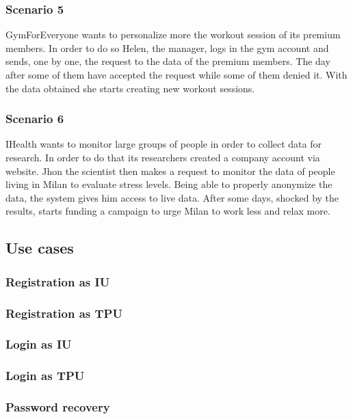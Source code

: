 \subsubsection{Scenario 5}
GymForEveryone wants to personalize more the workout session of its premium members. In order to do so Helen, the manager, logs in the gym account and sends, one by one, the request to the data of the premium members. The day after some of them have accepted the request while some of them denied it. With the data obtained she starts creating new workout sessions.
\subsubsection{Scenario 6}
IHealth wants to monitor large groups of people in order to collect data for research. In order to do that its researchers created a company account via website. Jhon the scientist then makes a request to monitor the data of people living in Milan to evaluate stress levels. Being able to properly anonymize the data, the system gives him access to live data. After some days, shocked by the results, starts funding a campaign to urge Milan to work less and relax more.
\clearpage


\subsection{Use cases}
\subsubsection{Registration as IU}

\clearpage
\subsubsection{Registration as TPU}

\clearpage
\subsubsection{Login as IU}

\clearpage
\subsubsection{Login as TPU}

\clearpage
\subsubsection{Password recovery}

\clearpage
